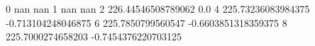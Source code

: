 0 nan nan
1 nan nan
2 226.44546508789062 0.0
4 225.73236083984375 -0.713104248046875
6 225.7850799560547 -0.6603851318359375
8 225.7000274658203 -0.7454376220703125
